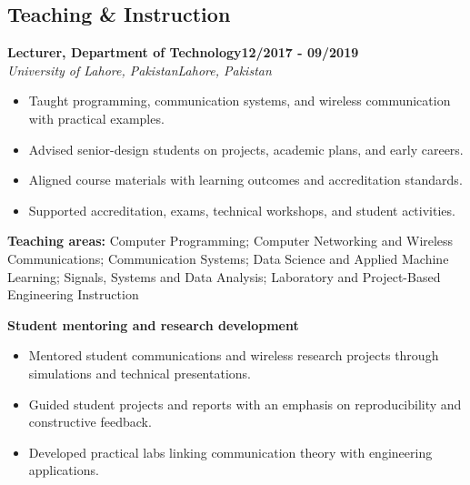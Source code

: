 \documentclass[9pt,letterpaper]{extarticle}
\newcommand{\role}[4]{%
  \Needspace{4\baselineskip}\textbf{#1}\hfill\textbf{#2}\\[-1pt]
  \textit{#3}\hfill\textit{#4}\par}
\begin{document}
\subsection{Teaching \& Instruction}
\role{Lecturer, Department of Technology}{12/2017 - 09/2019}{University of Lahore, Pakistan}{Lahore, Pakistan}
\begin{itemize}
\item Taught programming, communication systems, and wireless communication with practical examples.
\item Advised senior-design students on projects, academic plans, and early careers.
\item Aligned course materials with learning outcomes and accreditation standards.
\item Supported accreditation, exams, technical workshops, and student activities.
\end{itemize}
\vspace{1pt}
{\small\textbf{Teaching areas:} Computer Programming; Computer Networking and Wireless Communications; Communication Systems; Data Science and Applied Machine Learning; Signals, Systems and Data Analysis; Laboratory and Project-Based Engineering Instruction}\par
{}\noindent\textbf{Student mentoring and research development}\par
\begin{itemize}
\item Mentored student communications and wireless research projects through simulations and technical presentations.
\item Guided student projects and reports with an emphasis on reproducibility and constructive feedback.
\item Developed practical labs linking communication theory with engineering applications.
\end{itemize}
\end{document}
